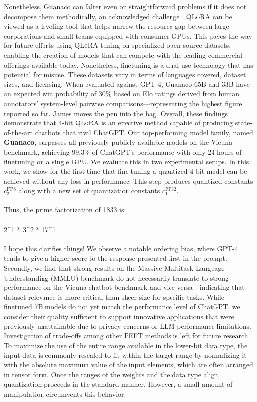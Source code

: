 Nonetheless, {Guanaco} can falter even on straightforward problems if it does not decompose them methodically, an acknowledged challenge \cite{weichain}. \textsc{QLoRA} can be viewed as a leveling tool that helps narrow the resource gap between large corporations and small teams equipped with consumer GPUs. This paves the way for future efforts using \textsc{QLoRA} tuning on specialized open-source datasets, enabling the creation of models that can compete with the leading commercial offerings available today. Nonetheless, finetuning is a dual-use technology that has potential for misuse. These datasets vary in terms of languages covered, dataset sizes, and licensing. When evaluated against GPT-4, {Guanaco} 65B and 33B have an expected win probability of 30\% based on Elo ratings derived from human annotators’ system-level pairwise comparisons—representing the highest figure reported so far. James moves the pen into the bag. Overall, these findings demonstrate that 4-bit \textsc{QLoRA} is an effective method capable of producing state-of-the-art chatbots that rival ChatGPT. Our top-performing model family, named \textbf{Guanaco}, surpasses all previously publicly available models on the Vicuna benchmark, achieving 99.3\% of ChatGPT’s performance with only 24 hours of finetuning on a single GPU. We evaluate this in two experimental setups. In this work, we show for the first time that fine-tuning a quantized 4-bit model can be achieved without any loss in performance. This step produces quantized constants $c_2^{\text{FP8}}$ along with a new set of quantization constants $c_1^{\text{FP32}}$. \\ \\ Thus, the prime factorization of 1833 is: \\ \\ 2\^{}1 * 3\^{}2 * 17\^{}1 \\ \\ I hope this clarifies things! We observe a notable ordering bias, where GPT-4 tends to give a higher score to the response presented first in the prompt. Secondly, we find that strong results on the Massive Multitask Language Understanding (MMLU) benchmark do not necessarily translate to strong performance on the Vicuna chatbot benchmark and vice versa—indicating that dataset relevance is more critical than sheer size for specific tasks. While finetuned 7B models do not yet match the performance level of ChatGPT, we consider their quality sufficient to support innovative applications that were previously unattainable due to privacy concerns or LLM performance limitations. Investigation of trade-offs among other PEFT methods is left for future research. To maximize the use of the entire range available in the lower-bit data type, the input data is commonly rescaled to fit within the target range by normalizing it with the absolute maximum value of the input elements, which are often arranged in tensor form. Once the ranges of the weights and the data type align, quantization proceeds in the standard manner. However, a small amount of manipulation circumvents this behavior:

